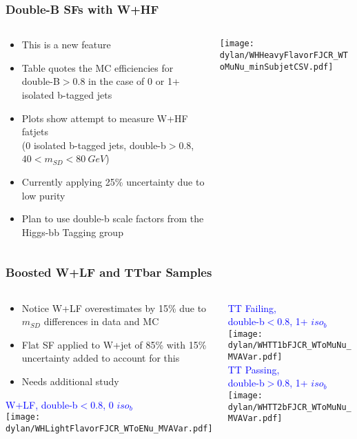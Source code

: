 \documentclass{beamer}
\begin{document}
\begin{frame}
  \frametitle{Double-B SFs with W+HF}
  \begin{columns}
    \begin{column}{0.5\linewidth}
      \begin{itemize}
      \item This is a new feature
      \item Table quotes the MC efficiencies for
        double-B$> 0.8$ in the case of 0 or 1+ isolated b-tagged jets
      \item Plots show attempt to measure W+HF fatjets \\
        (0 isolated b-tagged jets, double-b$> 0.8$, $40 < m_{SD} < \SI{80}{GeV}$)
      \item Currently applying 25\% uncertainty due to low purity
      \item Plan to use double-b scale factors from the Higgs-bb Tagging group
      \end{itemize}
    \end{column}
    \begin{column}{0.7\linewidth}
      {\footnotesize
        
      }
      \texttt{[image: dylan/WHHeavyFlavorFJCR\_WToMuNu\_minSubjetCSV.pdf]}
    \end{column}
  \end{columns}
\end{frame}

\begin{frame}
  \frametitle{Boosted W+LF and TTbar Samples}

  \begin{columns}
    \begin{column}{0.45\linewidth}
      \begin{itemize}
      \item Notice W+LF overestimates by 15\% due to $m_{SD}$ differences in data and MC
      \item Flat SF applied to W+jet of 85\% with 15\% uncertainty added to account for this
      \item Needs additional study
      \end{itemize}
      \centering
      \textcolor{blue}{W+LF, double-b$< 0.8$, 0 $iso_b$} \\
      \texttt{[image: dylan/WHLightFlavorFJCR\_WToENu\_MVAVar.pdf]} \\
    \end{column}
    \begin{column}{0.45\linewidth}
      \centering
      \textcolor{blue}{TT Failing, \\ double-b$< 0.8$, 1+ $iso_b$} \\
      \texttt{[image: dylan/WHTT1bFJCR\_WToMuNu\_MVAVar.pdf]} \\
      \textcolor{blue}{TT Passing, \\ double-b$> 0.8$, 1+ $iso_b$} \\
      \texttt{[image: dylan/WHTT2bFJCR\_WToMuNu\_MVAVar.pdf]}
    \end{column}
  \end{columns}

\end{frame}
\end{document}
